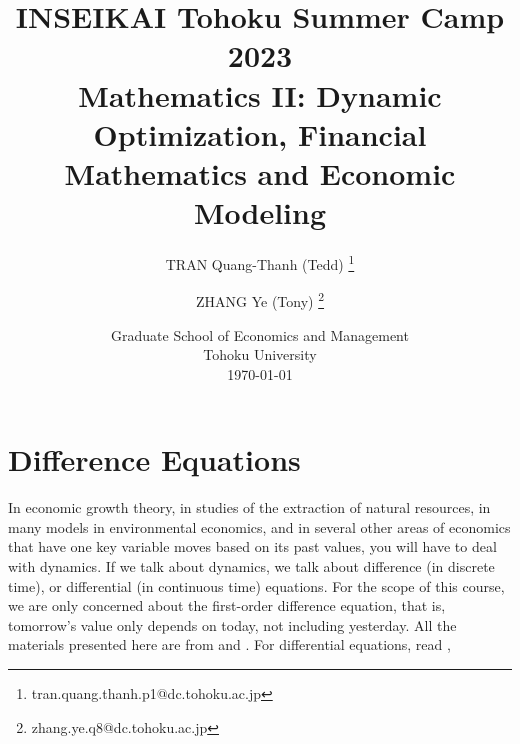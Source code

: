 \documentclass[11pt,a4paper]{book}
\author{%
	TRAN Quang-Thanh (Tedd) \thanks{tran.quang.thanh.p1@dc.tohoku.ac.jp}
	
	\and ZHANG Ye (Tony)  \thanks{zhang.ye.q8@dc.tohoku.ac.jp} 
		}
\title{INSEIKAI Tohoku Summer Camp 2023 \\ \textbf{Mathematics II: Dynamic Optimization, Financial Mathematics and Economic Modeling}}
\date{Graduate School of Economics and Management \\Tohoku University \\[\baselineskip] \today}
\theoremstyle{definition}\newtheorem{definition}{Definition}
\theoremstyle{definition}\newtheorem{fact}{Fact}
\theoremstyle{definition}\newtheorem{remark}{Remark}
\theoremstyle{definition}\newtheorem{ex}{Ex.}
\theoremstyle{definition}\newtheorem{project}{Project}
\theoremstyle{definition}\newtheorem{problem}{Problem}
\theoremstyle{definition}\newtheorem{example}{Example}
\numberwithin{theorem}{section}
\numberwithin{corollary}{chapter}
\numberwithin{assumption}{chapter}
\numberwithin{definition}{chapter}
\numberwithin{prop}{chapter}
\numberwithin{notation}{chapter}
\numberwithin{problem}{chapter}
\numberwithin{example}{chapter}
\numberwithin{fact}{chapter}
\numberwithin{ex}{chapter}
\begin{document}
	{
		\makeatletter
		\addtocounter{footnote}{1} %
		\renewcommand\thefootnote{\@fnsymbol\c@footnote}%
		\makeatother
		\maketitle
	}
	
	\setcounter{footnote}{0}
	\setcounter{tocdepth}{3}
	\tableofcontents
	
	\chapter{Difference Equations}
	In economic growth theory, in studies of the extraction of natural resources, in many models in environmental economics, and in several other areas of economics that have one key variable moves based on its past values, you will have to deal with dynamics. If we talk about dynamics, we talk about difference (in discrete time), or differential (in continuous time) equations. For the scope of this course, we are only concerned about the first-order difference equation, that is, tomorrow's value only depends on today, not including yesterday. All the materials presented here are from \citet{sydsaeter2008essential, sydsaeter2008further} and \citet[p.616]{chiang1984fundamental}. For differential equations, read \citet[Chapter 5, 6]{sydsaeter2008further}, \citet[Chapter 23,24,25]{simon1994mathematics}
	
	
\end{document}
